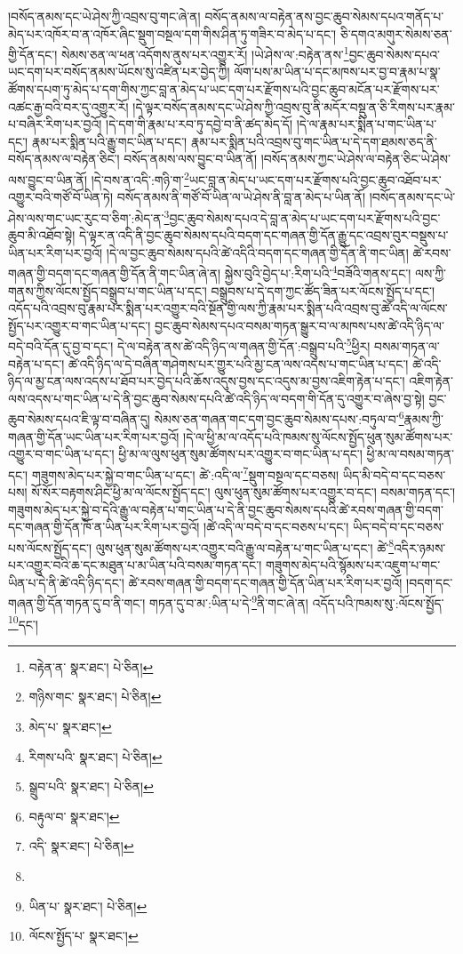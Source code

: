 །བསོད་ནམས་དང་ཡེ་ཤེས་ཀྱི་འབྲས་བུ་གང་ཞེ་ན། བསོད་ནམས་ལ་བརྟེན་ནས་བྱང་ཆུབ་སེམས་དཔའ་གནོད་པ་མེད་པར་འཁོར་བ་ན་འཁོར་ཞིང་སྡུག་བསྔལ་དག་གིས་ཤིན་ཏུ་གཟིར་བ་མེད་པ་དང་། ཅི་དགའ་མགུར་སེམས་ཅན་གྱི་དོན་དང་། སེམས་ཅན་ལ་ཕན་འདོགས་ནུས་པར་འགྱུར་རོ། །ཡེ་ཤེས་ལ་:བརྟེན་ནས་\footnote{བརྟེན་ན་  སྣར་ཐང་།  པེ་ཅིན། }བྱང་ཆུབ་སེམས་དཔའ་ཡང་དག་པར་བསོད་ནམས་ཡོངས་སུ་འཛིན་པར་བྱེད་ཀྱི། ལོག་པས་མ་ཡིན་པ་དང་མཁས་པར་བྱ་བ་རྣམ་པ་སྣ་ཚོགས་དཔག་ཏུ་མེད་པ་དག་གིས་ཀྱང་བླ་ན་མེད་པ་ཡང་དག་པར་རྫོགས་པའི་བྱང་ཆུབ་མངོན་པར་རྫོགས་པར་འཚང་རྒྱ་བའི་བར་དུ་འགྱུར་རོ། །དེ་ལྟར་བསོད་ནམས་དང་ཡེ་ཤེས་ཀྱི་འབྲས་བུ་ནི་མདོར་བསྡུ་ན་ཅི་རིགས་པར་རྣམ་པ་བཞིར་རིག་པར་བྱའོ། །དེ་དག་གི་རྣམ་པ་རབ་ཏུ་དབྱེ་བ་ནི་ཚད་མེད་དོ། །དེ་ལ་རྣམ་པར་སྨིན་པ་གང་ཡིན་པ་དང་། རྣམ་པར་སྨིན་པའི་རྒྱུ་གང་ཡིན་པ་དང་། རྣམ་པར་སྨིན་པའི་འབྲས་བུ་གང་ཡིན་པ་དེ་དག་ཐམས་ཅད་ནི་བསོད་ནམས་ལ་བརྟེན་ཅིང་། བསོད་ནམས་ལས་བྱུང་བ་ཡིན་ནོ། །བསོད་ནམས་ཀྱང་ཡེ་ཤེས་ལ་བརྟེན་ཅིང་ཡེ་ཤེས་ལས་བྱུང་བ་ཡིན་ནོ། །དེ་བས་ན་འདི་:གཉི་ག་\footnote{གཉིས་གང་  སྣར་ཐང་།  པེ་ཅིན། }ཡང་བླ་ན་མེད་པ་ཡང་དག་པར་རྫོགས་པའི་བྱང་ཆུབ་འཐོབ་པར་འགྱུར་བའི་གཙོ་བོ་ཡིན་ཏེ། བསོད་ནམས་ནི་གཙོ་བོ་ཡིན་ལ་ཡེ་ཤེས་ནི་བླ་ན་མེད་པ་ཡིན་ནོ། །བསོད་ནམས་དང་ཡེ་ཤེས་ལས་གང་ཡང་རུང་བ་ཅིག་:མེད་ན་\footnote{མེད་པ་  སྣར་ཐང་། }བྱང་ཆུབ་སེམས་དཔའ་དེ་བླ་ན་མེད་པ་ཡང་དག་པར་རྫོགས་པའི་བྱང་ཆུབ་མི་འཐོབ་སྟེ། དེ་ལྟར་ན་འདི་ནི་བྱང་ཆུབ་སེམས་དཔའི་བདག་དང་གཞན་གྱི་དོན་རྒྱུ་དང་འབྲས་བུར་བསྡུས་པ་ཡིན་པར་རིག་པར་བྱའོ། །དེ་ལ་བྱང་ཆུབ་སེམས་དཔའི་ཚེ་འདིའི་བདག་དང་གཞན་གྱི་དོན་ནི་གང་ཡིན། ཚེ་རབས་གཞན་གྱི་བདག་དང་གཞན་གྱི་དོན་ནི་གང་ཡིན་ཞེ་ན། སྐྱེས་བུའི་བྱེད་པ་:རིག་པའི་\footnote{རིགས་པའི་  སྣར་ཐང་།  པེ་ཅིན། }བཟོའི་གནས་དང་། ལས་ཀྱི་གནས་ཀྱིས་ལོངས་སྤྱོད་བསྒྲུབ་པ་གང་ཡིན་པ་དང་། བསྒྲུབས་པ་དེ་དག་ཀྱང་ཚོད་ཟིན་པར་ལོངས་སྤྱོད་པ་དང་། འདོད་པའི་འབྲས་བུ་རྣམ་པར་སྨིན་པར་འགྱུར་བའི་སྔོན་གྱི་ལས་ཀྱི་རྣམ་པར་སྨིན་པའི་འབྲས་བུ་ཚེ་འདི་ལ་ལོངས་སྤྱོད་པར་འགྱུར་བ་གང་ཡིན་པ་དང་། བྱང་ཆུབ་སེམས་དཔའ་བསམ་གཏན་སྒྱུར་བ་ལ་མཁས་པས་ཚེ་འདི་ཉིད་ལ་བདེ་བའི་དོན་དུ་བྱ་བ་དང་། དེ་ལ་བརྟེན་ནས་ཚེ་འདི་ཉིད་ལ་གཞན་གྱི་དོན་:བསྒྲུབ་པའི་\footnote{སྒྲུབ་པའི་  སྣར་ཐང་།  པེ་ཅིན། }ཕྱིར། བསམ་གཏན་ལ་བརྟེན་པ་དང་། ཚེ་འདི་ཉིད་ལ་དེ་བཞིན་གཤེགས་པར་གྱུར་པའི་མྱ་ངན་ལས་འདས་པ་གང་ཡིན་པ་དང་། ཚེ་འདི་ཉིད་ལ་མྱ་ངན་ལས་འདས་པ་ཐོབ་པར་བྱེད་པའི་ཆོས་འདུས་བྱས་དང་འདུས་མ་བྱས་འཇིག་རྟེན་པ་དང་། འཇིག་རྟེན་ལས་འདས་པ་གང་ཡིན་པ་དེ་ནི་བྱང་ཆུབ་སེམས་དཔའི་ཚེ་འདི་ཉིད་ལ་བདག་གི་དོན་དུ་འགྱུར་བ་ཞེས་བྱ་སྟེ། བྱང་ཆུབ་སེམས་དཔའ་ཇི་ལྟ་བ་བཞིན་དུ། སེམས་ཅན་གཞན་གང་དག་བྱང་ཆུབ་སེམས་དཔས་:བཏུལ་བ་\footnote{བརྟུལ་བ་  སྣར་ཐང་། }རྣམས་ཀྱི་གཞན་གྱི་དོན་ཡང་ཡིན་པར་རིག་པར་བྱའོ། །དེ་ལ་ཕྱི་མ་ལ་འདོད་པའི་ཁམས་སུ་ལོངས་སྤྱོད་ཕུན་སུམ་ཚོགས་པར་འགྱུར་བ་གང་ཡིན་པ་དང་། ཕྱི་མ་ལ་ལུས་ཕུན་སུམ་ཚོགས་པར་འགྱུར་བ་གང་ཡིན་པ་དང་། ཕྱི་མ་ལ་བསམ་གཏན་དང་། གཟུགས་མེད་པར་སྐྱེ་བ་གང་ཡིན་པ་དང་། ཚེ་:འདི་ལ་\footnote{འདི་  སྣར་ཐང་།  པེ་ཅིན། }སྡུག་བསྔལ་དང་བཅས། ཡིད་མི་བདེ་བ་དང་བཅས་པས། སོ་སོར་བརྟགས་ཤིང་ཕྱི་མ་ལ་ལོངས་སྤྱོད་དང་། ལུས་ཕུན་སུམ་ཚོགས་པར་འགྱུར་བ་དང་། བསམ་གཏན་དང་། གཟུགས་མེད་པར་སྐྱེ་བ་དེའི་རྒྱུ་ལ་བརྟེན་པ་གང་ཡིན་པ་དེ་ནི་བྱང་ཆུབ་སེམས་དཔའི་ཚེ་རབས་གཞན་གྱི་བདག་དང་གཞན་གྱི་དོན་ཁོ་ན་ཡིན་པར་རིག་པར་བྱའོ། །ཚེ་འདི་ལ་བདེ་བ་དང་བཅས་པ་དང་། ཡིད་བདེ་བ་དང་བཅས་པས་ལོངས་སྤྱོད་དང་། ལུས་ཕུན་སུམ་ཚོགས་པར་འགྱུར་བའི་རྒྱུ་ལ་བརྟེན་པ་གང་ཡིན་པ་དང་། ཚེ་\footnote{}འདིར་ཉམས་པར་འགྱུར་བའི་ཆ་དང་མཐུན་པ་མ་ཡིན་པའི་བསམ་གཏན་དང་། གཟུགས་མེད་པའི་སྙོམས་པར་འཇུག་པ་གང་ཡིན་པ་དེ་ནི་ཚེ་འདི་ཉིད་དང་། ཚེ་རབས་གཞན་གྱི་བདག་དང་གཞན་གྱི་དོན་ཡིན་པར་རིག་པར་བྱའོ། །བདག་དང་གཞན་གྱི་དོན་གཏན་དུ་བ་ནི་གང་། གཏན་དུ་བ་མ་:ཡིན་པ་དེ་\footnote{ཡིན་པ་  སྣར་ཐང་།  པེ་ཅིན། }ནི་གང་ཞེ་ན། འདོད་པའི་ཁམས་སུ་:ལོངས་སྤྱོད་\footnote{ལོངས་སྤྱོད་པ་  སྣར་ཐང་། }དང་། 